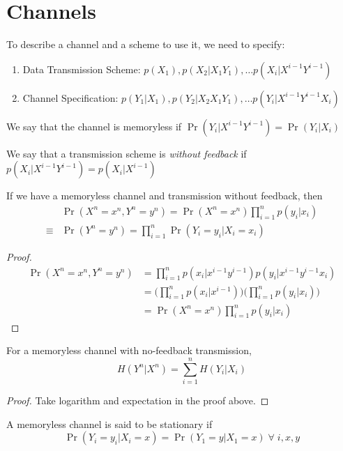 \section{Channels}
To describe a channel and a scheme to use it, we need to specify:
\begin{enumerate}
    \item Data Transmission Scheme: $p(X_1), p(X_2|X_1Y_1), \dots p(X_i|X^{i-1}Y^{i-1})$
    \item Channel Specification: $p(Y_1|X_1), p(Y_2|X_2X_1Y_1), \dots p(Y_i|X^{i-1} Y^{i-1} X_i)$
\end{enumerate}
\begin{definition}[Memorylessness]
We say that the channel is memoryless if $\Pr(Y_i|X^{i-1}Y^{i-1}) = \Pr(Y_i|X_i)$
\end{definition}
\begin{definition}[Feedbackless]
We say that a transmission scheme is \textit{without feedback} if \\$p(X_i|X^{i-1}Y^{i-1}) = p(X_i|X^{i-1})$
\end{definition}
\begin{theorem}
If we have a memoryless channel and transmission without feedback, then
\begin{align*}&\Pr(X^n = x^n, Y^n = y^n) = \Pr(X^n=x^n) \prod_{i=1}^n p(y_i|x_i) \\
\equiv &\Pr(Y^n = y^n) = \prod_{i=1}^n \Pr(Y_i=y_i|X_i=x_i)
\end{align*}
\end{theorem}
\begin{proof}
\begin{align*}
    \Pr(X^n = x^n, Y^n = y^n) &= \prod_{i=1}^n p(x_i|x^{i-1}y^{i-1}) p(y_i|x^{i-1}y^{i-1}x_i) \\
    &= \bigg(\prod_{i=1}^n p(x_i|x^{i-1})\bigg) \bigg(\prod_{i=1}^n p(y_i|x_i)\bigg) \\
    &= \Pr(X^n = x^n)\prod_{i=1}^n p(y_i|x_i)
\end{align*}
\end{proof}
\begin{corollary}
For a memoryless channel with no-feedback transmission,
\[H(Y^n|X^n) = \sum_{i=1}^n H(Y_i|X_i)\]
\end{corollary}
\begin{proof}
    Take logarithm and expectation in the proof above.
\end{proof}
\begin{definition}[Stationarity]
A memoryless channel is said to be stationary if
\[\Pr(Y_i=y_i|X_i=x) = \Pr(Y_1=y|X_1=x) \;\forall\;i,x,y\]
\end{definition}
